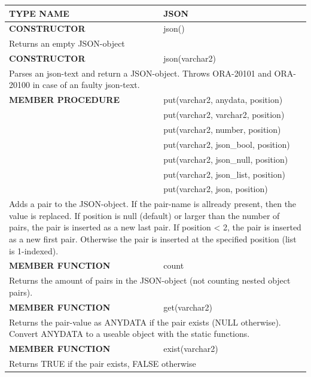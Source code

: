 \documentclass[11pt,twocolumn, a4paper]{article}
\begin{document}
\begin{longtable}{| l | l |}
\hline
  \rowcolor{gray}\color{white}\textbf{TYPE NAME} & \color{white}\textbf{JSON} \\
\hline

\hline
  \textbf{CONSTRUCTOR} & json()\\
\hline
  \multicolumn{2}{|p{15cm}|}{Returns an empty JSON-object} \\
\hline

\hline
  \textbf{CONSTRUCTOR} & json(varchar2)\\
\hline
  \multicolumn{2}{|p{15cm}|}{Parses an json-text and return a JSON-object. 
Throws ORA-20101 and ORA-20100 in case of an faulty json-text.} \\
\hline

\hline
  \textbf{MEMBER PROCEDURE} & put(varchar2, anydata, position)\\
  & put(varchar2, varchar2, position)\\
  & put(varchar2, number, position)\\
  & put(varchar2, json\_bool, position)\\
  & put(varchar2, json\_null, position)\\
  & put(varchar2, json\_list, position)\\
  & put(varchar2, json, position)\\
\hline
  \multicolumn{2}{|p{15cm}|}{Adds a pair to the JSON-object. If the pair-name is allready present, then the value is replaced. If position is null (default) or larger than the number of pairs, the pair is inserted as a new last pair. If position < 2, the pair is inserted as a new first pair. Otherwise the pair is inserted at the specified position (list is 1-indexed).} \\
\hline

\hline
  \textbf{MEMBER FUNCTION} & count\\
\hline
  \multicolumn{2}{|p{15cm}|}{Returns the amount of pairs in the JSON-object (not counting nested object pairs).} \\
\hline

\hline
  \textbf{MEMBER FUNCTION} & get(varchar2)\\
\hline
  \multicolumn{2}{|p{15cm}|}{Returns the pair-value as ANYDATA if the pair exists (NULL otherwise). Convert ANYDATA to a useable object with the static functions.} \\
\hline

\hline
  \textbf{MEMBER FUNCTION} & exist(varchar2)\\
\hline
  \multicolumn{2}{|p{15cm}|}{Returns TRUE if the pair exists, FALSE otherwise} \\
\hline


\end{longtable}
\end{document}
